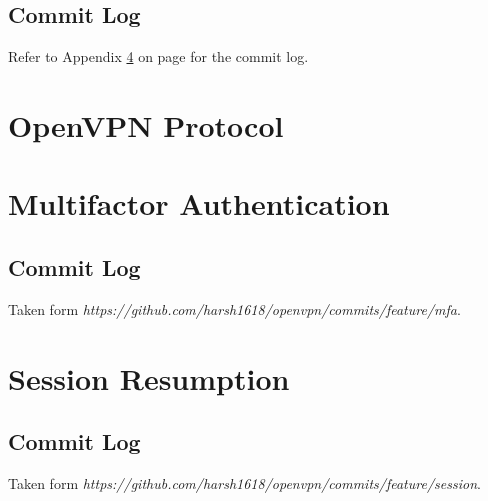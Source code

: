 \documentclass[11pt,oneside]{book}
\begin{document}
\section{Commit Log}
Refer to Appendix \ref{Session:Commit} on page \pageref{Session:Commit} for the commit log.

\appendix
\chapter{OpenVPN Protocol}
\label{OpenVPN:Protocol}


\chapter{Multifactor Authentication}
\label{MFA:Commit}
\section{Commit Log}
Taken form \emph{https://github.com/harsh1618/openvpn/commits/feature/mfa}.\\


\chapter{Session Resumption}
\label{Session:Commit}
\section{Commit Log}
Taken form \emph{https://github.com/harsh1618/openvpn/commits/feature/session}.\\





\printindex
{}
\end{document}
